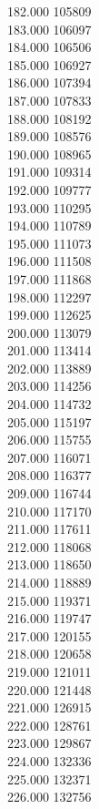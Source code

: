 { 182.000	105809 \\
 183.000	106097 \\
 184.000	106506 \\
 185.000	106927 \\
 186.000	107394 \\
 187.000	107833 \\
 188.000	108192 \\
 189.000	108576 \\
 190.000	108965 \\
 191.000	109314 \\
 192.000	109777 \\
 193.000	110295 \\
 194.000	110789 \\
 195.000	111073 \\
 196.000	111508 \\
 197.000	111868 \\
 198.000	112297 \\
 199.000	112625 \\
 200.000	113079 \\
 201.000	113414 \\
 202.000	113889 \\
 203.000	114256 \\
 204.000	114732 \\
 205.000	115197 \\
 206.000	115755 \\
 207.000	116071 \\
 208.000	116377 \\
 209.000	116744 \\
 210.000	117170 \\
 211.000	117611 \\
 212.000	118068 \\
 213.000	118650 \\
 214.000	118889 \\
 215.000	119371 \\
 216.000	119747 \\
 217.000	120155 \\
 218.000	120658 \\
 219.000	121011 \\
 220.000	121448 \\
 221.000	126915 \\
 222.000	128761 \\
 223.000	129867 \\
 224.000	132336 \\
 225.000	132371 \\
 226.000	132756 \\
}
